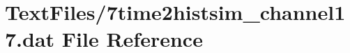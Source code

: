 \hypertarget{7time2histsim__channel17_8dat}{}\section{Text\+Files/7time2histsim\+\_\+channel17.dat File Reference}
\label{7time2histsim__channel17_8dat}
